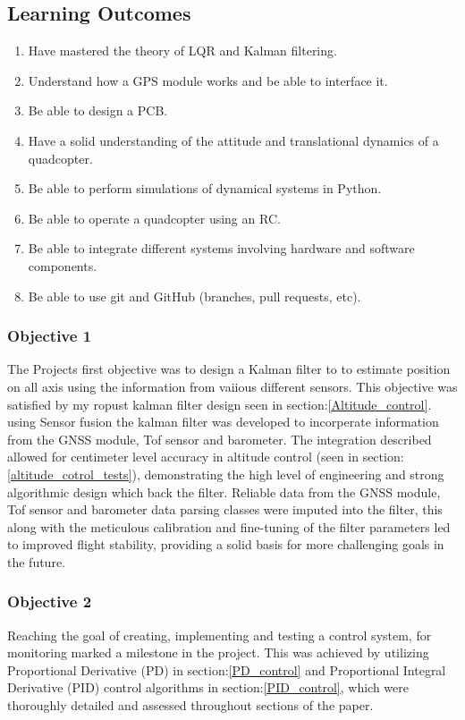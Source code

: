 \documentclass{article}
\begin{document}
\subsection*{Learning Outcomes}
\begin{enumerate}
  \item Have mastered the theory of LQR and Kalman filtering.
  \item Understand how a GPS module works and be able to interface it.
  \item Be able to design a PCB.
  \item Have a solid understanding of the attitude and translational dynamics of
  a quadcopter.
  \item Be able to perform simulations of dynamical systems in Python.
  \item Be able to operate a quadcopter using an RC.
  \item Be able to integrate different systems involving hardware and software
  components.
  \item Be able to use git and GitHub (branches, pull requests, etc).
\end{enumerate}

\subsubsection*{Objective 1}
The Projects first objective was to design a Kalman filter to to estimate
position on all axis using the information from vaiious different sensors. This
objective was satisfied by my ropust  kalman filter design seen in
section:\ref{Altitude_control}. using Sensor fusion the kalman filter was
developed to incorperate information from the GNSS module, Tof sensor and
barometer. The integration described allowed for centimeter level accuracy in
altitude control (seen in section:\ref{altitude_cotrol_tests}), demonstrating
the high level of engineering and strong algorithmic design which back the
filter. Reliable data from the GNSS module, Tof sensor and barometer data
parsing classes were imputed into the filter, this along with the meticulous
calibration and fine-tuning of the filter parameters led to improved flight
stability, providing a solid basis for more challenging goals in the future.

\subsubsection*{Objective 2}
Reaching the goal of creating, implementing and testing a control system, for
monitoring marked a milestone in the project. This was achieved by utilizing
Proportional Derivative (PD) in section:\ref{PD_control} and Proportional
Integral Derivative (PID) control algorithms in section:\ref{PID_control}, which
were thoroughly detailed and assessed throughout sections of the paper.
\end{document}
